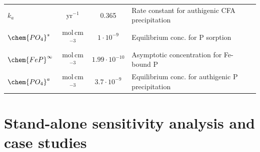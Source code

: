 \documentclass[gmd, manuscript]{copernicus}
\begin{document}
\begin{table}[btp]
\begin{tabular}{l c c l}
$k_a$ & yr$^{-1}$ & 0.365 & Rate constant for authigenic CFA precipitation\\
$\chem{PO_4}^s$ & mol\,cm$^{-3}$ & $1\cdot 10^{-9}$ & Equilibrium conc. for P sorption\\
$\chem{FeP}^\infty$ & mol\,cm$^{-3}$ & $1.99\cdot 10^{-10}$ & Asymptotic concentration for Fe-bound P\\
$\chem{PO_4}^a$ & mol\,cm$^{-3}$ &  $3.7\cdot 10^{-9}$ & Equilibrium conc. for authigenic P precipitation\\

\hline\hline
\end{tabular}
\label{table:reaction_parameters}
\end{table}


\section{Stand-alone sensitivity analysis and case studies}

\end{document}
